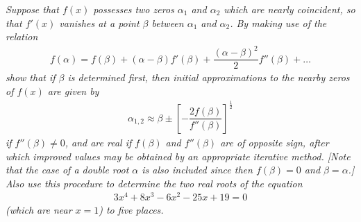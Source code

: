 \documentclass[12pt]{article}
\begin{document}
{\it Suppose that $f(x)$ possesses two zeros $\alpha_1$ and $\alpha_2$ which are nearly coincident, so that $f'(x)$ vanishes at a point $\beta$ between $\alpha_1$ and $\alpha_2$.  By making use of the relation}
\begin{align*}
f(\alpha) = f(\beta) + (\alpha - \beta)f'(\beta) + \dfrac{(\alpha - \beta)^2}{2}f''(\beta) + \dots
\end{align*}
{\it show that if $\beta$ is determined first, then initial approximations to the nearby zeros of $f(x)$ are given by}
\begin{align*}
\alpha_{1,2} \approx \beta \pm \left[-\dfrac{2f(\beta)}{f''(\beta)}\right]^{\frac{1}{2}}
\end{align*}
{\it if $f''(\beta) \neq 0$, and are real if $f(\beta)$ and $f''(\beta)$ are of opposite sign, after which improved values may be obtained by an appropriate iterative method.  [Note that the case of a double root $\alpha$ is also included since then $f(\beta) = 0$ and $\beta = \alpha$.]  Also use this procedure to determine the two real roots of the equation
\begin{align*}
3x^4 + 8x^3 - 6x^2 - 25x + 19 = 0
\end{align*}
(which are near $x = 1$) to five places.}\\
\end{document}
